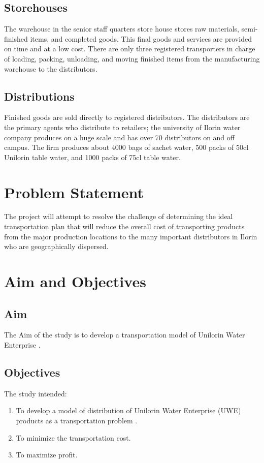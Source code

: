 \documentclass[12pt]{report}
\newcommand{\stp}{transportation problem }
\newcommand{\uwe}{Unilorin Water Enterprise }
\begin{document}
	\subsection{Storehouses}
	The warehouse in the senior staff quarters store house stores raw materials, semi-finished items, and completed goods. This final goods and services are provided on time and at a low cost. There are only three registered transporters in charge of loading, packing, unloading, and moving finished items from the manufacturing warehouse to the distributors.
	
	\subsection{Distributions}
	Finished goods are sold directly to registered distributors. The distributors are the primary agents who distribute to retailers; the university of Ilorin water company produces on a huge scale and has over 70 distributors on and off campus. The firm produces about 4000 bags of sachet water, 500 packs of 50cl Unilorin table water, and 1000 packs of 75cl table water.

	\section{Problem Statement}
	The project will attempt to resolve the challenge of determining the ideal transportation plan that will reduce the overall cost of transporting products from the major production locations to the many important distributors in Ilorin who are geographically dispersed.

	\section{Aim and Objectives}
	\subsection{Aim}
	The Aim of the study is to develop a transportation model of \uwe.
	\subsection{Objectives}
	The study intended:
	\begin{enumerate}
		\renewcommand{\labelenumi}{(\roman{enumi})}
		\item To develop a model of distribution of Unilorin Water Enterprise (UWE) products as a \stp.
		\item To minimize the transportation cost.
		\item To maximize profit.
	\end{enumerate}
	
\end{document}
